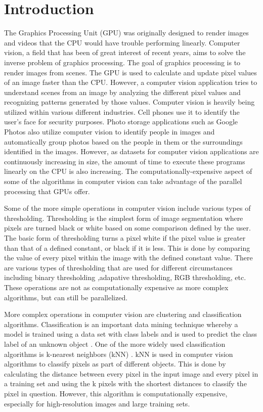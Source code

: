 \documentclass[conference]{IEEEtran}
\begin{document}
\section{Introduction}
The Graphics Processing Unit (GPU) was originally designed to render images and videos
that the CPU would have trouble performing linearly. Computer vision, a field that has been
of great interest of recent years, aims to solve the inverse problem of graphics processing.
The goal of graphics processing is to render images from scenes. The GPU is used to 
calculate and update pixel values of an image faster than the CPU. However, a computer 
vision application tries to understand scenes from an image by analyzing the different pixel
values and recognizing patterns generated by those values. Computer vision is heavily being 
utilized within various different industries. Cell phones use it to identify the user's face for security purposes. 
Photo storage applications such as Google Photos 
also utilize computer vision to identify people in images and automatically group photos based
on the people in them or the surroundings identified in the images. However, as datasets for 
computer vision applications are continuously increasing in size, the amount of time 
to execute these programs linearly on the CPU is also increasing. The computationally-expensive
aspect of some of the algorithms in computer vision can take advantage of the parallel processing
that GPUs offer. 

Some of the more simple operations in computer vision include various types of thresholding.
Thresholding is the simplest form of image segmentation where pixels are turned black or white
based on some comparison defined by the user. The basic form of thresholding turns a pixel white
if the pixel value is greater than that of a defined constant, or black if it is less. This is done by comparing
the value of every pixel within the image with the defined constant value. There are various types of thresholding
that are used for different circumstances including binary thresholding ,adapative thresholding, RGB thresholding, etc.
These operations are not as computationally expensive as more complex algorithms, but can still be parallelized.

More complex operations in computer vision are clustering and classification algorithms. Classification
is an important data mining technique whereby a model is trained using a data set with class labels and is 
used to predict the class label of an unknown object \cite{GPUKNN1}. One of the more widely used classification algorithms
is k-nearest neighbors (kNN) \cite{kNN}. kNN is used in computer vision algorithms to classify pixels as part of 
different objects. This is done by calculating the distance between every pixel in the input image and every pixel in a training set
and using the k pixels with the shortest distances to classify the pixel in question. However, this algorithm is computationally expensive,
especially for high-resolution images and large training sets.
\end{document}
